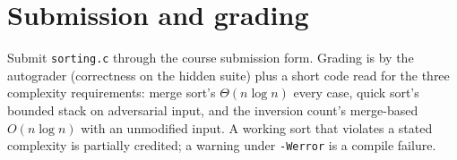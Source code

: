 \documentclass[11pt]{article}
\begin{document}
\section{Submission and grading}

Submit \texttt{sorting.c} through the course submission form. Grading is by the autograder (correctness on the hidden suite) plus a short code read for the three complexity requirements: merge sort's $\Theta(n\log n)$ every case, quick sort's bounded stack on adversarial input, and the inversion count's merge-based $O(n\log n)$ with an unmodified input. A working sort that violates a stated complexity is partially credited; a warning under \texttt{-Werror} is a compile failure.



\end{document}
